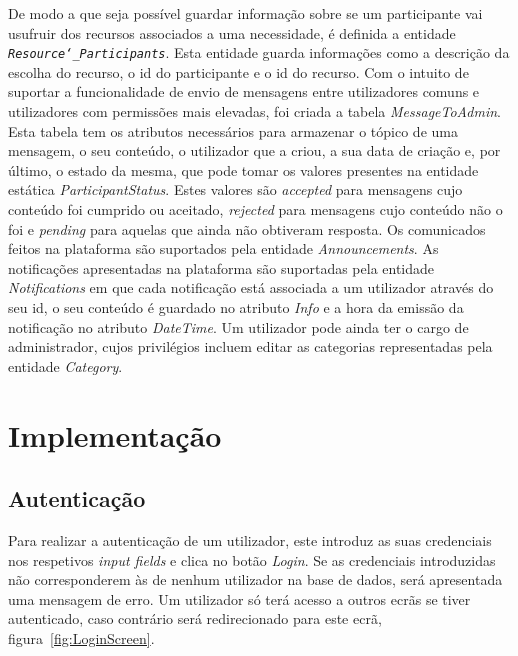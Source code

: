 De modo a que seja possível guardar informação sobre se um participante vai usufruir dos recursos associados a uma necessidade, é definida a entidade \texttt{\textit{Resource\char`_Participants}}.
Esta entidade guarda informações como a descrição da escolha do recurso, o id do participante e o id do recurso.
Com o intuito de suportar a funcionalidade de envio de mensagens entre utilizadores comuns e utilizadores com permissões mais elevadas, foi criada a tabela \textit{MessageToAdmin}. 
Esta tabela tem os atributos necessários para armazenar o tópico de uma mensagem, o seu conteúdo, o utilizador que a criou, a sua data de criação e, por último, o estado da mesma, que pode tomar os valores presentes na entidade estática \textit{ParticipantStatus}. 
Estes valores são \textit{accepted} para mensagens cujo conteúdo foi cumprido ou aceitado, \textit{rejected} para mensagens cujo conteúdo não o foi e \textit{pending} para aquelas que ainda não obtiveram resposta.
Os comunicados feitos na plataforma são suportados pela entidade \textit{Announcements}. As notificações apresentadas na plataforma são suportadas pela entidade \textit{Notifications} em que cada notificação está associada a um utilizador através do seu id, o seu conteúdo é guardado no atributo \textit{Info} e a hora da emissão da notificação no atributo \textit{DateTime}. 
Um utilizador pode ainda ter o cargo de administrador, cujos privilégios incluem editar as categorias representadas pela entidade \textit{Category}.

\section{Implementação}\label{sec:implementacao}

\subsection{Autenticação}\label{subsec:implementacao:login}

Para realizar a autenticação de um utilizador, este introduz as suas credenciais nos respetivos \textit{input fields} e clica no botão \textit{Login}.
Se as credenciais introduzidas não corresponderem às de nenhum utilizador na base de dados, será apresentada uma mensagem de erro.
Um utilizador só terá acesso a outros ecrãs se tiver autenticado, caso contrário será redirecionado para este ecrã, figura~\ref{fig:LoginScreen}.

